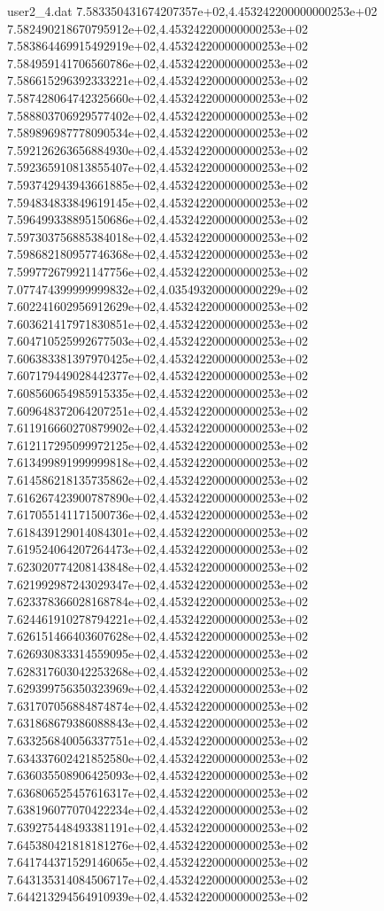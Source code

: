 \begin{filecontents}{user2_4.dat}
7.583350431674207357e+02,4.453242200000000253e+02
7.582490218670795912e+02,4.453242200000000253e+02
7.583864469915492919e+02,4.453242200000000253e+02
7.584959141706560786e+02,4.453242200000000253e+02
7.586615296392333221e+02,4.453242200000000253e+02
7.587428064742325660e+02,4.453242200000000253e+02
7.588803706929577402e+02,4.453242200000000253e+02
7.589896987778090534e+02,4.453242200000000253e+02
7.592126263656884930e+02,4.453242200000000253e+02
7.592365910813855407e+02,4.453242200000000253e+02
7.593742943943661885e+02,4.453242200000000253e+02
7.594834833849619145e+02,4.453242200000000253e+02
7.596499338895150686e+02,4.453242200000000253e+02
7.597303756885384018e+02,4.453242200000000253e+02
7.598682180957746368e+02,4.453242200000000253e+02
7.599772679921147756e+02,4.453242200000000253e+02
7.077474399999999832e+02,4.035493200000000229e+02
7.602241602956912629e+02,4.453242200000000253e+02
7.603621417971830851e+02,4.453242200000000253e+02
7.604710525992677503e+02,4.453242200000000253e+02
7.606383381397970425e+02,4.453242200000000253e+02
7.607179449028442377e+02,4.453242200000000253e+02
7.608560654985915335e+02,4.453242200000000253e+02
7.609648372064207251e+02,4.453242200000000253e+02
7.611916660270879902e+02,4.453242200000000253e+02
7.612117295099972125e+02,4.453242200000000253e+02
7.613499891999999818e+02,4.453242200000000253e+02
7.614586218135735862e+02,4.453242200000000253e+02
7.616267423900787890e+02,4.453242200000000253e+02
7.617055141171500736e+02,4.453242200000000253e+02
7.618439129014084301e+02,4.453242200000000253e+02
7.619524064207264473e+02,4.453242200000000253e+02
7.623020774208143848e+02,4.453242200000000253e+02
7.621992987243029347e+02,4.453242200000000253e+02
7.623378366028168784e+02,4.453242200000000253e+02
7.624461910278794221e+02,4.453242200000000253e+02
7.626151466403607628e+02,4.453242200000000253e+02
7.626930833314559095e+02,4.453242200000000253e+02
7.628317603042253268e+02,4.453242200000000253e+02
7.629399756350323969e+02,4.453242200000000253e+02
7.631707056884874874e+02,4.453242200000000253e+02
7.631868679386088843e+02,4.453242200000000253e+02
7.633256840056337751e+02,4.453242200000000253e+02
7.634337602421852580e+02,4.453242200000000253e+02
7.636035508906425093e+02,4.453242200000000253e+02
7.636806525457616317e+02,4.453242200000000253e+02
7.638196077070422234e+02,4.453242200000000253e+02
7.639275448493381191e+02,4.453242200000000253e+02
7.645380421818181276e+02,4.453242200000000253e+02
7.641744371529146065e+02,4.453242200000000253e+02
7.643135314084506717e+02,4.453242200000000253e+02
7.644213294564910939e+02,4.453242200000000253e+02

\end{filecontents}
